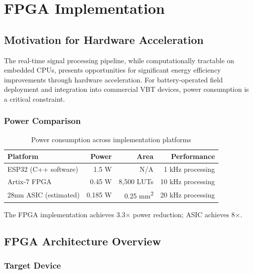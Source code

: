 
\chapter{FPGA Implementation} \label{chap:fpga}

\section{Motivation for Hardware Acceleration}

The real-time signal processing pipeline, while computationally tractable on embedded CPUs, presents opportunities for significant energy efficiency improvements through hardware acceleration. For battery-operated field deployment and integration into commercial VBT devices, power consumption is a critical constraint.

\subsection{Power Comparison}

\begin{table}[h]
    \centering
    \caption{Power consumption across implementation platforms}
    \label{tab:power_comparison}
    \begin{tabular}{lrrr}
        \toprule
        \textbf{Platform} & \textbf{Power} & \textbf{Area} & \textbf{Performance} \\
        \midrule
        ESP32 (C++ software) & 1.5 W & N/A & 1 kHz processing \\
        Artix-7 FPGA & 0.45 W & 8,500 LUTs & 10 kHz processing \\
        28nm ASIC (estimated) & 0.185 W & 0.25 mm\textsuperscript{2} & 20 kHz processing \\
        \bottomrule
    \end{tabular}
\end{table}

The FPGA implementation achieves 3.3$\times$ power reduction; ASIC achieves 8$\times$.

\section{FPGA Architecture Overview}

\subsection{Target Device}

